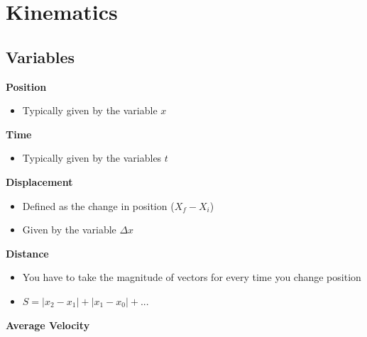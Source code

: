\documentclass[
  letterpaper,
  DIV=11,
  numbers=noendperiod]{scrartcl}
\author{}
\date{}
\providecommand{\tightlist}{%
  \setlength{\itemsep}{0pt}\setlength{\parskip}{0pt}}\usepackage{longtable,booktabs,array}
\renewcommand*\contentsname{Table of contents}
\newcommand\contentsname{Table of contents}
\begin{document}

\newpage

\ifdefined\Shaded\renewenvironment{Shaded}{\begin{tcolorbox}[borderline west={3pt}{0pt}{shadecolor}, enhanced, boxrule=0pt, sharp corners, frame hidden, interior hidden, breakable]}{\end{tcolorbox}}\fi

\renewcommand*\contentsname{Table of Contents}
{
\hypersetup{linkcolor=}
\setcounter{tocdepth}{4}
\tableofcontents
}
\newpage{}

\hypertarget{kinematics}{%
\section{Kinematics}\label{kinematics}}

\hypertarget{variables}{%
\subsection{Variables}\label{variables}}

\textbf{Position}

\begin{itemize}
\tightlist
\item
  Typically given by the variable \(x\)
\end{itemize}

\textbf{Time}

\begin{itemize}
\tightlist
\item
  Typically given by the variables \(t\)
\end{itemize}

\textbf{Displacement}

\begin{itemize}
\tightlist
\item
  Defined as the change in position (\(X_f - X_i\))
\item
  Given by the variable \(\Delta x\)
\end{itemize}

\textbf{Distance}

\begin{itemize}
\tightlist
\item
  You have to take the magnitude of vectors for every time you change
  position
\item
  \(S = |x_2 - x_1| + |x_1 - x_0| + ...\)
\end{itemize}

\textbf{Average Velocity}
\end{document}
